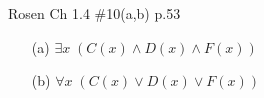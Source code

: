 \documentclass[12pt,addpoints]{exam}
\begin{document}
\begin{questions}
\question[4] Rosen Ch 1.4 \#10(a,b) p.53
    \begin{solution}
    \begin{itemize}
        \item[(a)] $\exists x\; (C(x) \wedge D(x) \wedge F(x))$
        \item[(b)] $\forall x\; (C(x) \vee D(x) \vee F(x))$
    \end{itemize}
    \end{solution}


\end{questions}
\end{document}
